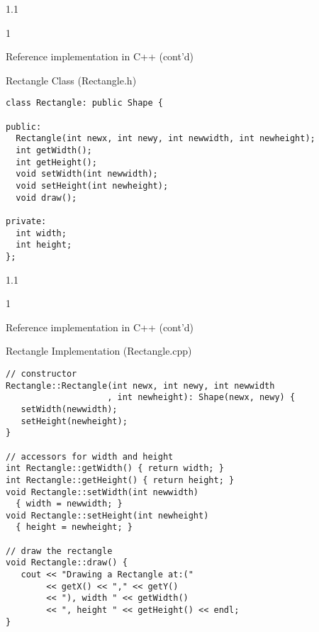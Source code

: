 \documentclass{slides}
\newenvironment{myslide}{\begin{slide}\color{Blue}\begin{boxedminipage}{1.1\hsize}\begin{boxedminipage}{1\hsize}\color{Black}
\vspace{-170\in}
}{%
\smallskip
\end{boxedminipage}
\end{boxedminipage}
\end{slide}}
\newenvironment{myslide}{\begin{slide}
}{%
\end{slide}}
\newenvironment{myslide}{\begin{slide}\color{White}\begin{boxedminipage}{1.1\hsize}\color{Black}
\vspace{-170\in}
}{%
\smallskip
\end{boxedminipage}
\end{slide}}
\newcommand{\header}[1]{{\large \color{Red} #1}}
\begin{document}



\begin{myslide}

\header{Reference implementation in C++ (cont'd)}

Rectangle Class (Rectangle.h)

{\tiny

\begin{verbatim}
class Rectangle: public Shape {

public:
  Rectangle(int newx, int newy, int newwidth, int newheight);
  int getWidth();
  int getHeight();
  void setWidth(int newwidth);
  void setHeight(int newheight);
  void draw();

private:
  int width;
  int height;
};
\end{verbatim}

}

\end{myslide}






\begin{myslide}

\header{Reference implementation in C++ (cont'd)}

Rectangle Implementation (Rectangle.cpp)

{\tiny

\begin{verbatim}
// constructor
Rectangle::Rectangle(int newx, int newy, int newwidth
                    , int newheight): Shape(newx, newy) {
   setWidth(newwidth);
   setHeight(newheight);
}

// accessors for width and height
int Rectangle::getWidth() { return width; }
int Rectangle::getHeight() { return height; }
void Rectangle::setWidth(int newwidth)
  { width = newwidth; }
void Rectangle::setHeight(int newheight)
  { height = newheight; }

// draw the rectangle
void Rectangle::draw() {
   cout << "Drawing a Rectangle at:("
        << getX() << "," << getY()
        << "), width " << getWidth()
        << ", height " << getHeight() << endl;
}
\end{verbatim}

}

\end{myslide}
\end{document}
